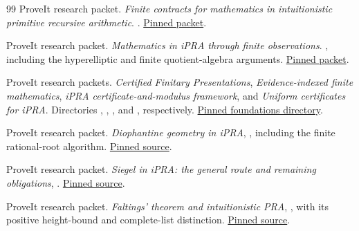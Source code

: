 \begin{thebibliography}{99}
ProveIt research packet. \emph{Finite contracts for mathematics in intuitionistic primitive recursive arithmetic}.
.
\href{https://github.com/VladimirReshetnikov/ProveIt/tree/b0f6f535ffc16324683fef2c263260a88ae03755/Logic/PrimitiveRecursiveArithmetic/docs/proofs/foundations/ipra_framework}{Pinned packet}.

ProveIt research packet. \emph{Mathematics in iPRA through finite observations}.
, including the hyperelliptic and finite quotient-algebra arguments.
\href{https://github.com/VladimirReshetnikov/ProveIt/tree/b0f6f535ffc16324683fef2c263260a88ae03755/Logic/PrimitiveRecursiveArithmetic/docs/proofs/foundations/ipra_embedding_framework}{Pinned packet}.

ProveIt research packets. \emph{Certified Finitary Presentations},
\emph{Evidence-indexed finite mathematics},
\emph{iPRA certificate-and-modulus framework}, and
\emph{Uniform certificates for iPRA}.
Directories ,
, ,
and , respectively.
\href{https://github.com/VladimirReshetnikov/ProveIt/tree/b0f6f535ffc16324683fef2c263260a88ae03755/Logic/PrimitiveRecursiveArithmetic/docs/proofs/foundations}{Pinned foundations directory}.

ProveIt research packet. \emph{Diophantine geometry in iPRA},
, including the finite rational-root algorithm.
\href{https://github.com/VladimirReshetnikov/ProveIt/blob/b0f6f535ffc16324683fef2c263260a88ae03755/Logic/PrimitiveRecursiveArithmetic/docs/proofs/diophantine-number-theory/diophantine_geometry_ipra/sections/02_heights.tex}{Pinned source}.

ProveIt research packet. \emph{Siegel in iPRA: the general route and remaining obligations},
.
\href{https://github.com/VladimirReshetnikov/ProveIt/blob/b0f6f535ffc16324683fef2c263260a88ae03755/Logic/PrimitiveRecursiveArithmetic/docs/proofs/diophantine-number-theory/siegel_ipra/paper/05_general_route.tex}{Pinned source}.

ProveIt research packet. \emph{Faltings' theorem and intuitionistic PRA},
, with its positive height-bound and complete-list distinction.
\href{https://github.com/VladimirReshetnikov/ProveIt/blob/b0f6f535ffc16324683fef2c263260a88ae03755/Logic/PrimitiveRecursiveArithmetic/docs/proofs/diophantine-number-theory/faltings_ipra/README.md}{Pinned source}.


\end{thebibliography}

